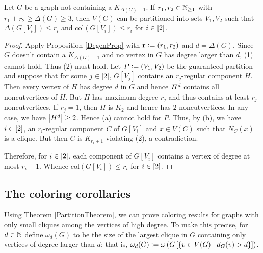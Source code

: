 		\begin{cor}
		Let $G$ be a graph not containing a $K_{\Delta(G) + 1}$. If $r_1, r_2 \in
		\mathbb{N}_{\geq 1}$ with $r_1 + r_2 \geq \Delta(G) \geq 3$, then $V(G)$ can be
		partitioned into sets $V_1, V_2$ such that $\Delta(G[V_i]) \leq r_i$ and $\text{col}(G[V_i]) \leq r_i$ for $i \in \left[2\right]$.
		\end{cor}
		\begin{proof}
		Apply Proposition \ref{DegenProp} with $\mathbf{r} \mathrel{\mathop:}= \left( r_1, r_2 \right)$
		and $d = \Delta(G)$.  Since $G$ doesn't contain a $K_{\Delta(G) + 1}$ and no
		vertex in $G$ has degree larger than $d$, (1) cannot hold.  Thus (2) must
		hold.  Let $P \mathrel{\mathop:}= (V_1, V_2)$ be the guaranteed partition and suppose
		that for some $j \in \left[2\right]$, $G[V_j]$ contains an $r_j$-regular component
		$H$.  Then every vertex of $H$ has degree $d$ in $G$ and
		hence $H^{d}$ contains all noncutvertices of $H$.  But $H$ has maximum
		degree $r_j$ and thus contains at least $r_j$ noncutvertices.  If $r_j = 1$, then $H$ is $K_2$ and hence has $2$ noncutvertices. In any case,
		we have $\left|H^{d}\right| \geq 2$.  Hence (a) cannot hold for $P$.  Thus, by (b),
		we have $i \in \left[2\right]$, an $r_i$-regular component $C$ of $G[V_i]$ and $x
		\in V(C)$ such that $N_C(x)$ is a clique.  But then $C$ is $K_{r_i + 1}$
		violating (2), a contradiction.
		
		Therefore, for $i \in \left[2\right]$, each component of $G[V_i]$ contains a
		vertex of degree at most $r_i - 1$.  Whence $\text{col}(G[V_i]) \leq r_i$ for
		$i \in \left[2\right]$.
		\end{proof}

	\subsection{The coloring corollaries}
	Using Theorem \ref{PartitionTheorem}, we can prove coloring results for graphs
	with only small cliques among the vertices of high degree. To make this
	precise, for $d \in \mathbb{N}$ define $\omega_d(G)$ to be the size of the largest
	clique in $G$ containing only vertices of degree larger than $d$; that is, $\omega_d(G)
	\mathrel{\mathop:}= \omega\left( G\left[ \left\{ v \in V(G) \mid d_G(v) > d \right\} \right] \right)$.
	
